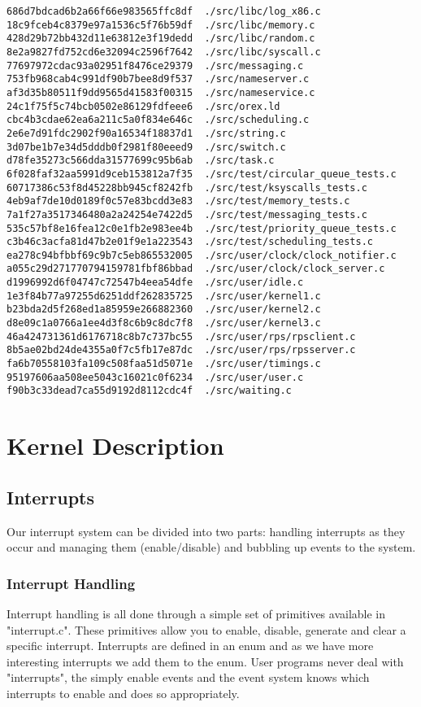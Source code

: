 \documentclass{article}
\begin{document}
\begin{verbatim}
686d7bdcad6b2a66f66e983565ffc8df  ./src/libc/log_x86.c
18c9fceb4c8379e97a1536c5f76b59df  ./src/libc/memory.c
428d29b72bb432d11e63812e3f19dedd  ./src/libc/random.c
8e2a9827fd752cd6e32094c2596f7642  ./src/libc/syscall.c
77697972cdac93a02951f8476ce29379  ./src/messaging.c
753fb968cab4c991df90b7bee8d9f537  ./src/nameserver.c
af3d35b80511f9dd9565d41583f00315  ./src/nameservice.c
24c1f75f5c74bcb0502e86129fdfeee6  ./src/orex.ld
cbc4b3cdae62ea6a211c5a0f834e646c  ./src/scheduling.c
2e6e7d91fdc2902f90a16534f18837d1  ./src/string.c
3d07be1b7e34d5dddb0f2981f80eeed9  ./src/switch.c
d78fe35273c566dda31577699c95b6ab  ./src/task.c
6f028faf32aa5991d9ceb153812a7f35  ./src/test/circular_queue_tests.c
60717386c53f8d45228bb945cf8242fb  ./src/test/ksyscalls_tests.c
4eb9af7de10d0189f0c57e83bcdd3e83  ./src/test/memory_tests.c
7a1f27a3517346480a2a24254e7422d5  ./src/test/messaging_tests.c
535c57bf8e16fea12c0e1fb2e983ee4b  ./src/test/priority_queue_tests.c
c3b46c3acfa81d47b2e01f9e1a223543  ./src/test/scheduling_tests.c
ea278c94bfbbf69c9b7c5eb865532005  ./src/user/clock/clock_notifier.c
a055c29d271770794159781fbf86bbad  ./src/user/clock/clock_server.c
d1996992d6f04747c72547b4eea54dfe  ./src/user/idle.c
1e3f84b77a97255d6251ddf262835725  ./src/user/kernel1.c
b23bda2d5f268ed1a85959e266882360  ./src/user/kernel2.c
d8e09c1a0766a1ee4d3f8c6b9c8dc7f8  ./src/user/kernel3.c
46a424731361d6176718c8b7c737bc55  ./src/user/rps/rpsclient.c
8b5ae02bd24de4355a0f7c5fb17e87dc  ./src/user/rps/rpsserver.c
fa6b70558103fa109c508faa51d5071e  ./src/user/timings.c
95197606aa508ee5043c16021c0f6234  ./src/user/user.c
f90b3c33dead7ca55d9192d8112cdc4f  ./src/waiting.c
\end{verbatim}
\section{Kernel Description}

\subsection{Interrupts}

Our interrupt system can be divided into two parts: handling interrupts as they occur and managing them (enable/disable) and bubbling up events to the system.

\subsubsection{Interrupt Handling}

Interrupt handling is all done through a simple set of primitives available in "interrupt.c". These primitives allow you to enable, disable, generate and clear a specific interrupt. Interrupts are defined in an enum and as we have more interesting interrupts we add them to the enum. User programs never deal with "interrupts", the simply enable events and the event system knows which interrupts to enable and does so appropriately.
\end{document}
